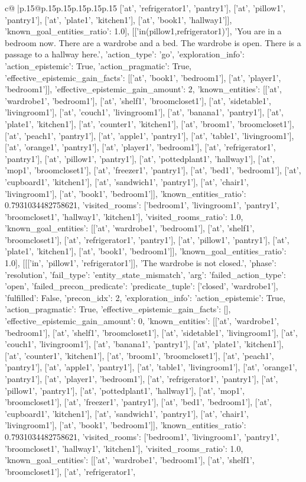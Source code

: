 \documentclass{article}
\begin{document}
{\begin{supertabular}{c@{$\;$}|p{.15\linewidth}@{}p{.15\linewidth}p{.15\linewidth}p{.15\linewidth}p{.15\linewidth}p{.15\linewidth}}
{{{['at', 'refrigerator1', 'pantry1'], ['at', 'pillow1', 'pantry1'], ['at', 'plate1', 'kitchen1'], ['at', 'book1', 'hallway1']], 'known_goal_entities_ratio': 1.0}}], [['in(pillow1,refrigerator1)'], 'You are in a bedroom now. There are a wardrobe and a bed. The wardrobe is open. There is a passage to a hallway here.', {'action_type': 'go', 'exploration_info': {'action_epistemic': True, 'action_pragmatic': True, 'effective_epistemic_gain_facts': [['at', 'book1', 'bedroom1'], ['at', 'player1', 'bedroom1']], 'effective_epistemic_gain_amount': 2, 'known_entities': [['at', 'wardrobe1', 'bedroom1'], ['at', 'shelf1', 'broomcloset1'], ['at', 'sidetable1', 'livingroom1'], ['at', 'couch1', 'livingroom1'], ['at', 'banana1', 'pantry1'], ['at', 'plate1', 'kitchen1'], ['at', 'counter1', 'kitchen1'], ['at', 'broom1', 'broomcloset1'], ['at', 'peach1', 'pantry1'], ['at', 'apple1', 'pantry1'], ['at', 'table1', 'livingroom1'], ['at', 'orange1', 'pantry1'], ['at', 'player1', 'bedroom1'], ['at', 'refrigerator1', 'pantry1'], ['at', 'pillow1', 'pantry1'], ['at', 'pottedplant1', 'hallway1'], ['at', 'mop1', 'broomcloset1'], ['at', 'freezer1', 'pantry1'], ['at', 'bed1', 'bedroom1'], ['at', 'cupboard1', 'kitchen1'], ['at', 'sandwich1', 'pantry1'], ['at', 'chair1', 'livingroom1'], ['at', 'book1', 'bedroom1']], 'known_entities_ratio': 0.7931034482758621, 'visited_rooms': ['bedroom1', 'livingroom1', 'pantry1', 'broomcloset1', 'hallway1', 'kitchen1'], 'visited_rooms_ratio': 1.0, 'known_goal_entities': [['at', 'wardrobe1', 'bedroom1'], ['at', 'shelf1', 'broomcloset1'], ['at', 'refrigerator1', 'pantry1'], ['at', 'pillow1', 'pantry1'], ['at', 'plate1', 'kitchen1'], ['at', 'book1', 'bedroom1']], 'known_goal_entities_ratio': 1.0}}], [[['in', 'pillow1', 'refrigerator1']], 'The wardrobe is not closed.', {'phase': 'resolution', 'fail_type': 'entity_state_mismatch', 'arg': {'failed_action_type': 'open', 'failed_precon_predicate': {'predicate_tuple': ['closed', 'wardrobe1'], 'fulfilled': False, 'precon_idx': 2}}, 'exploration_info': {'action_epistemic': True, 'action_pragmatic': True, 'effective_epistemic_gain_facts': [], 'effective_epistemic_gain_amount': 0, 'known_entities': [['at', 'wardrobe1', 'bedroom1'], ['at', 'shelf1', 'broomcloset1'], ['at', 'sidetable1', 'livingroom1'], ['at', 'couch1', 'livingroom1'], ['at', 'banana1', 'pantry1'], ['at', 'plate1', 'kitchen1'], ['at', 'counter1', 'kitchen1'], ['at', 'broom1', 'broomcloset1'], ['at', 'peach1', 'pantry1'], ['at', 'apple1', 'pantry1'], ['at', 'table1', 'livingroom1'], ['at', 'orange1', 'pantry1'], ['at', 'player1', 'bedroom1'], ['at', 'refrigerator1', 'pantry1'], ['at', 'pillow1', 'pantry1'], ['at', 'pottedplant1', 'hallway1'], ['at', 'mop1', 'broomcloset1'], ['at', 'freezer1', 'pantry1'], ['at', 'bed1', 'bedroom1'], ['at', 'cupboard1', 'kitchen1'], ['at', 'sandwich1', 'pantry1'], ['at', 'chair1', 'livingroom1'], ['at', 'book1', 'bedroom1']], 'known_entities_ratio': 0.7931034482758621, 'visited_rooms': ['bedroom1', 'livingroom1', 'pantry1', 'broomcloset1', 'hallway1', 'kitchen1'], 'visited_rooms_ratio': 1.0, 'known_goal_entities': [['at', 'wardrobe1', 'bedroom1'], ['at', 'shelf1', 'broomcloset1'], ['at', 'refrigerator1', }}}
\end{supertabular}}
\end{document}

